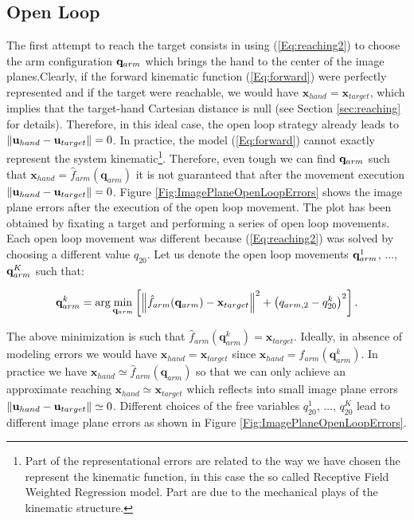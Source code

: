 \subsection{Open Loop}
The first attempt to reach the target consists in using (\ref{Eq:reaching2})
to choose the arm configuration $\mathbf q_{arm}$ which brings the hand to the center 
of the image planes.Clearly, if the forward 
kinematic function (\ref{Eq:forward}) were perfectly represented and if the target were reachable, we would have $\mathbf x_{hand} =  \mathbf x_{target}$, which implies that the target-hand Cartesian distance 
 is null (see Section \ref{sec:reaching} for details). Therefore, in this ideal case, the open loop 
 strategy already leads to $\| \mathbf{u}_{hand} - \mathbf{u}_{target} \| = 0$. In practice, the model 
 (\ref{Eq:forward}) cannot exactly represent the system kinematic\footnote{Part of the representational 
 errors are related to the way we have chosen the represent the kinematic function, in this case the
 so called Receptive Field Weighted Regression model. Part are due to the mechanical plays of the
 kinematic structure.}. Therefore, even tough we can find $\mathbf q_{arm}$ such that $\mathbf x_{hand}=
 \hat f_{arm}(\mathbf q_{arm})$ it is not guaranteed that after the movement execution 
 $\| \mathbf{u}_{hand} - \mathbf{u}_{target} \| = 0$. Figure \ref{Fig:ImagePlaneOpenLoopErrors}
 shows the image plane errors after the execution of the open loop movement. The plot has been obtained
 by fixating a target and performing a series of open loop movements. Each open loop
 movement was different because (\ref{Eq:reaching2}) was solved 
 by choosing a different value $q_{20}$. Let us denote the open loop movements $\mathbf q_{arm}^1$, $\dots$, 
 $\mathbf q_{arm}^K$ such that:
 
 \begin{eqnarray} \label{Eq:OpenLoopMovements}
 \mathbf q_{arm}^k = \arg \min_{\mathbf q_{arm}}
  \left[
  \left\| \hat f_{arm}(\mathbf q_{arm}) - \mathbf x_{target}\right\|^2 + \left(q_{arm,2}-q_{20}^k\right)^2
  \right].
 \end{eqnarray}
 
 The above minimization is such that $\hat f_{arm}(\mathbf q_{arm}^k) = \mathbf x_{target}$. Ideally, in absence
 of modeling errors we would have $ \mathbf x_{hand} = \mathbf x_{target}$ since $\mathbf x_{hand} = f_{arm}(\mathbf q_{arm}^k)$. In practice we have $\mathbf x_{hand} \simeq \hat f_{arm}(\mathbf q_{arm})$ 
 so that we can only achieve an approximate reaching $ \mathbf x_{hand} \simeq \mathbf x_{target}$ 
 which reflects into small image plane errors $\| \mathbf{u}_{hand} - \mathbf{u}_{target}\| \simeq 0$. Different choices 
 of the free variables $q_{20}^1$, $\dots$, $q_{20}^K$ lead to different image plane errors as shown 
 in Figure \ref{Fig:ImagePlaneOpenLoopErrors}.



